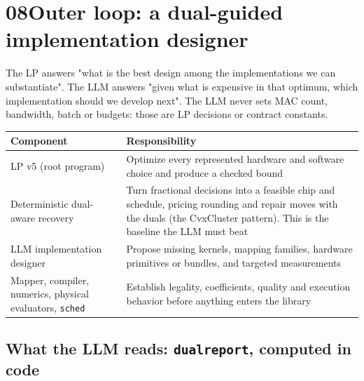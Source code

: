 \documentclass[10pt]{article}
\renewcommand{\_}{\textunderscore\allowbreak}
\begin{document}
\section*{08\quad Outer loop: a dual-guided implementation designer}
 

The LP answers "what is the best design among the implementations we can substantiate". The LLM answers "given what is expensive in that optimum, which implementation should we develop next". The LLM never sets MAC count, bandwidth, batch or budgets: those are LP decisions or contract constants.

         
\begingroup\scriptsize
\setlength{\tabcolsep}{3pt}
\renewcommand{\arraystretch}{1.18}
\begin{xltabular}{\textwidth}{@{}>{\hsize\raggedright\arraybackslash}X >{\hsize\raggedright\arraybackslash}X@{}}
\toprule
\textbf{Component} & \textbf{Responsibility}\\
\midrule\endhead
LP v5 (root program) & Optimize every represented hardware and software choice and produce a checked bound\\
Deterministic dual-aware recovery & Turn fractional decisions into a feasible chip and schedule, pricing rounding and repair moves with the duals (the CvxCluster pattern). This is the baseline the LLM must beat\\
LLM implementation designer & Propose missing kernels, mapping families, hardware primitives or bundles, and targeted measurements\\
Mapper, compiler, numerics, physical evaluators, \texttt{sched} & Establish legality, coefficients, quality and execution behavior before anything enters the library\\
\bottomrule\end{xltabular}\endgroup
 
\subsection*{What the LLM reads: \texttt{dual\_report}, computed in code}
 
\end{document}
